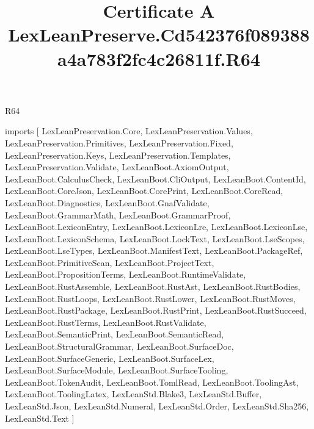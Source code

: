 \begin{lexlean}{R64}
\title{Certificate A LexLeanPreserve.Cd542376f089388a4a783f2fc4c26811f.R64}
\begin{coremodule}
imports [
  LexLeanPreservation.Core,
  LexLeanPreservation.Values,
  LexLeanPreservation.Primitives,
  LexLeanPreservation.Fixed,
  LexLeanPreservation.Keys,
  LexLeanPreservation.Templates,
  LexLeanPreservation.Validate,
  LexLeanBoot.AxiomOutput,
  LexLeanBoot.CalculusCheck,
  LexLeanBoot.CliOutput,
  LexLeanBoot.ContentId,
  LexLeanBoot.CoreJson,
  LexLeanBoot.CorePrint,
  LexLeanBoot.CoreRead,
  LexLeanBoot.Diagnostics,
  LexLeanBoot.GnafValidate,
  LexLeanBoot.GrammarMath,
  LexLeanBoot.GrammarProof,
  LexLeanBoot.LexiconEntry,
  LexLeanBoot.LexiconLre,
  LexLeanBoot.LexiconLse,
  LexLeanBoot.LexiconSchema,
  LexLeanBoot.LockText,
  LexLeanBoot.LseScopes,
  LexLeanBoot.LseTypes,
  LexLeanBoot.ManifestText,
  LexLeanBoot.PackageRef,
  LexLeanBoot.PrimitiveScan,
  LexLeanBoot.ProjectText,
  LexLeanBoot.PropositionTerms,
  LexLeanBoot.RuntimeValidate,
  LexLeanBoot.RustAssemble,
  LexLeanBoot.RustAst,
  LexLeanBoot.RustBodies,
  LexLeanBoot.RustLoops,
  LexLeanBoot.RustLower,
  LexLeanBoot.RustMoves,
  LexLeanBoot.RustPackage,
  LexLeanBoot.RustPrint,
  LexLeanBoot.RustSucceed,
  LexLeanBoot.RustTerms,
  LexLeanBoot.RustValidate,
  LexLeanBoot.SemanticPrint,
  LexLeanBoot.SemanticRead,
  LexLeanBoot.StructuralGrammar,
  LexLeanBoot.SurfaceDoc,
  LexLeanBoot.SurfaceGeneric,
  LexLeanBoot.SurfaceLex,
  LexLeanBoot.SurfaceModule,
  LexLeanBoot.SurfaceTooling,
  LexLeanBoot.TokenAudit,
  LexLeanBoot.TomlRead,
  LexLeanBoot.ToolingAst,
  LexLeanBoot.ToolingLatex,
  LexLeanStd.Blake3,
  LexLeanStd.Buffer,
  LexLeanStd.Json,
  LexLeanStd.Numeral,
  LexLeanStd.Order,
  LexLeanStd.Sha256,
  LexLeanStd.Text
]


\end{coremodule}
\end{lexlean}
